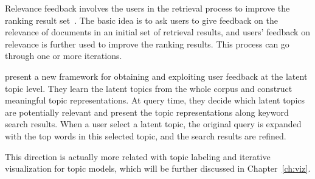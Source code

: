 Relevance feedback involves the users in the retrieval process to improve the ranking result set~\citep{Rocchio-1971}. The basic idea is to ask users to give feedback on the relevance of documents in an initial set of retrieval results, and users' feedback on relevance is further used to improve the ranking results. This process can go through one or more iterations.

\cite{Andrzejewski-2011} present a new framework for obtaining and
exploiting user feedback at the latent topic level. They learn the
latent topics from the whole corpus and construct meaningful topic
representations. At query time, they decide which latent topics are
potentially relevant and present the topic representations along
keyword search results. When a user select a latent topic, the
original query is expanded with the top words in this selected topic,
and the search results are refined.

This direction is actually more related with topic labeling and iterative visualization for topic models, which will be further discussed in Chapter~\ref{ch:viz}.




